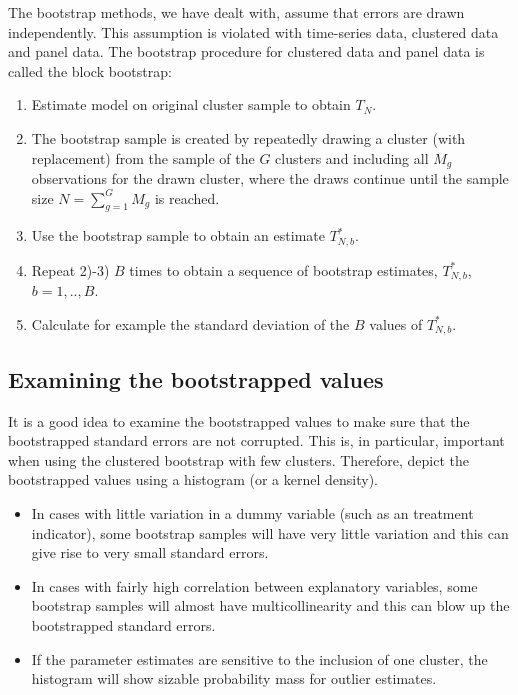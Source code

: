 \documentclass{article}
\begin{document}
The bootstrap methods, we have dealt with, assume that errors are drawn
independently. This assumption is violated with time-series data, clustered
data and panel data. The bootstrap procedure for clustered data and panel
data is called the block bootstrap:

\begin{enumerate}
\item Estimate model on original cluster sample to obtain $T_{N}$.

\item The bootstrap sample is created by repeatedly drawing a cluster (with
replacement) from the sample of the $G$ clusters and including all $M_{g}$
observations for the drawn cluster, where the draws continue until the
sample size $N=\sum_{g=1}^{G}M_{g}$ is reached.

\item Use the bootstrap sample to obtain an estimate $T_{N,b}^{\ast }$.

\item Repeat 2)-3) $B$ times to obtain a sequence of bootstrap estimates, $%
T_{N,b}^{\ast }$, $b=1,..,B$.

\item Calculate for example the standard deviation of the $B$ values of $%
T_{N,b}^{\ast }$.
\end{enumerate}

\subsection{Examining the bootstrapped values}

It is a good idea to examine the bootstrapped values to make sure that the
bootstrapped standard errors are not corrupted. This is, in particular,
important when using the clustered bootstrap with few clusters. Therefore,
depict the bootstrapped values using a histogram (or a kernel density).

\begin{itemize}
\item In cases with little variation in a dummy variable (such as an
treatment indicator), some bootstrap samples will have very little variation
and this can give rise to very small standard errors.

\item In cases with fairly high correlation between explanatory variables,
some bootstrap samples will almost have multicollinearity and this can blow
up the bootstrapped standard errors.

\item If the parameter estimates are sensitive to the inclusion of one
cluster, the histogram will show sizable probability mass for outlier
estimates.
\end{itemize}
\end{document}
